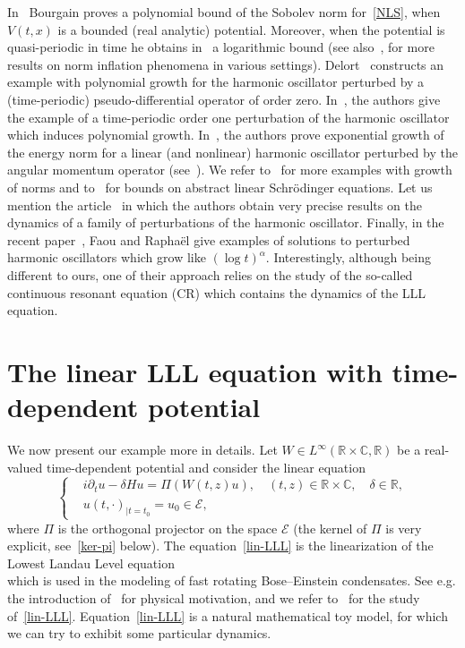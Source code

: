 \documentclass[AHL,Unicode,published]{cedram}
\newcommand{\C}{\mathbb{C}}
\newcommand{\R}{\mathbb{R}}
\newcommand{\E}{\mathcal{E}}
\newcommand{\<}{\langle}
\renewcommand{\>}{\rangle}
\newcommand{\R}{\mathbb{R}}
\begin{document}
In~\cite{Bou99a} Bourgain proves a polynomial bound of the Sobolev norm for~\eqref{NLS}, when $V(t,x)$ is a bounded (real analytic) potential. Moreover, when the potential is quasi-periodic in time he obtains in~\cite{Bou99b} a logarithmic bound (see also~\cite{Delort,FangZhang, GPT,Wang2008}, for more results on norm inflation phenomena in various settings). Delort~\cite{Delort2} constructs an example with polynomial growth for the harmonic oscillator perturbed by a (time-periodic) pseudo-differential operator of order zero. In~\cite{BGMR2}, the authors give the example of a time-periodic order one perturbation of the harmonic oscillator which induces polynomial growth. In~\cite{ANS}, the authors prove exponential growth of the energy norm for a linear (and nonlinear) harmonic oscillator perturbed by the angular momentum operator (see~\cite[Theorem~4.5]{ANS}). We refer to~\cite{HausMaspero,Maspero} for more examples with growth of norms and to~\cite{BGMR} for bounds on abstract linear Schr\"odinger equations. Let us mention the article~\cite{LZZ} in which the authors obtain very precise results on the dynamics of a family of perturbations of the harmonic oscillator. Finally, in the recent paper~\cite{Faou-Rapha}, Faou and Rapha\"el give examples of solutions to perturbed harmonic oscillators which grow like $(\log t)^\alpha$. Interestingly, although being different to ours, one of their approach relies on the study of the so-called continuous resonant equation (CR) which contains the dynamics of the LLL equation.



\section{The linear LLL equation with time-dependent potential}\label{Sect2}

We now present our example more in details. Let $W\in L^{\infty}(\R\times
\C,\R)$ be a real-valued time-dependent potential and consider the linear equation
\begin{equation}\label{lin-LLL}
\left\{
\begin{aligned}
&i\partial_t u- \delta H u=\Pi\left(W(t,z)u\right), \quad (t,z)\in \R\times \C, \quad \delta \in \R,\\
&u(t, \cdot)_{|t=t_0}= u_0 \in \E,
\end{aligned}
\right.
\end{equation}
where $\Pi$ is the orthogonal projector on the space $\E$ (the kernel of $\Pi$ is very explicit, see~\eqref{ker-pi} below). The equation~\eqref{lin-LLL} is the linearization of the Lowest Landau Level equation
\begin{equation}\label{eq-disp}
\end{equation}
which is used in the modeling of fast rotating Bose--Einstein condensates. See e.g. the introduction of~\cite{GGT} for physical motivation, and we refer to~\cite{ABN,BiBiCrEv2, BiBiEv,GGT, Nier,Schw-Tho} for the study of~\eqref{lin-LLL}. Equation~\eqref{lin-LLL} is a natural mathematical toy model, for which we can try to exhibit some particular dynamics.
\end{document}
